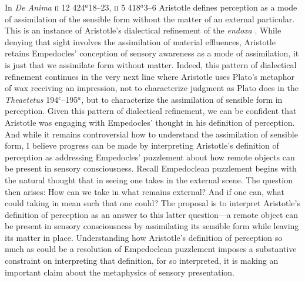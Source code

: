 In \emph{De Anima} \textsc{ii} 12 424\( ^{a} \)18--23, \textsc{ii} 5 418\( ^{a} \)3--6 Aristotle defines perception as a mode of assimilation of the sensible form without the matter of an external particular. This is an instance of Aristotle's dialectical refinement of the \emph{endoxa} \citep[on Aristotle's dialectic in \emph{De Anima} see][]{Witt:1995kx}. While denying that sight involves the assimilation of material effluences, Aristotle retains Empedocles' conception of sensory awareness as a mode of assimilation, it is just that we assimilate form without matter. Indeed, this pattern of dialectical refinement continues in the very next line where Aristotle uses Plato's metaphor of wax receiving an impression, not to characterize judgment as Plato does in the \emph{Theaetetus} 194\( ^{c} \)--195\( ^{a} \), but to characterize the assimilation of sensible form in perception. Given this pattern of dialectical refinement, we can be confident that Aristotle was engaging with Empedocles' thought in his definition of perception. And while it remains controversial how to understand the assimilation of sensible form, I believe progress can be made by interpreting Aristotle's definition of perception as addressing Empedocles' puzzlement about how remote objects can be present in sensory consciousness. Recall Empedoclean puzzlement begins with the natural thought that in seeing one takes in the external scene. The question then arises: How can we take in what remains external? And if one can, what could taking in mean such that one could? The proposal is to interpret Aristotle's definition of perception as an answer to this latter question---a remote object can be present in sensory consciousness by assimilating its sensible form while leaving its matter in place. Understanding how Aristotle's definition of perception so much as could be a resolution of Empedoclean puzzlement imposes a substantive constraint on interpreting that definition, for so interpreted, it is making an important claim about the metaphysics of sensory presentation.


